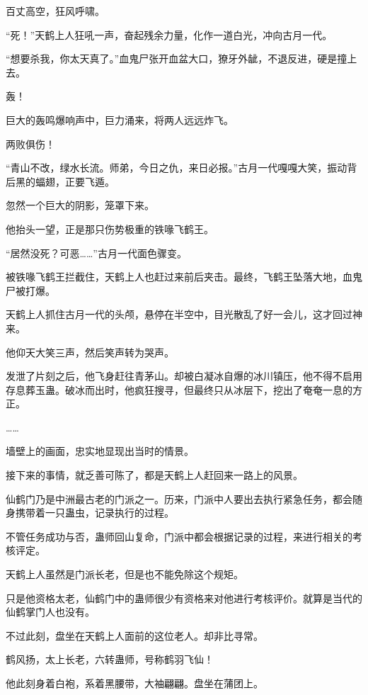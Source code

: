 
\begin{this_body}



百丈高空，狂风呼啸。

“死！”天鹤上人狂吼一声，奋起残余力量，化作一道白光，冲向古月一代。

“想要杀我，你太天真了。”血鬼尸张开血盆大口，獠牙外龇，不退反进，硬是撞上去。

轰！

巨大的轰鸣爆响声中，巨力涌来，将两人远远炸飞。

两败俱伤！

“青山不改，绿水长流。师弟，今日之仇，来日必报。”古月一代嘎嘎大笑，振动背后黑的蝠翅，正要飞遁。

忽然一个巨大的阴影，笼罩下来。

他抬头一望，正是那只伤势极重的铁喙飞鹤王。

“居然没死？可恶……”古月一代面色骤变。

被铁喙飞鹤王拦截住，天鹤上人也赶过来前后夹击。最终，飞鹤王坠落大地，血鬼尸被打爆。

天鹤上人抓住古月一代的头颅，悬停在半空中，目光散乱了好一会儿，这才回过神来。

他仰天大笑三声，然后笑声转为哭声。

发泄了片刻之后，他飞身赶往青茅山。却被白凝冰自爆的冰川镇压，他不得不启用存息葬玉蛊。破冰而出时，他疯狂搜寻，但最终只从冰层下，挖出了奄奄一息的方正。

……

墙壁上的画面，忠实地显现出当时的情景。

接下来的事情，就乏善可陈了，都是天鹤上人赶回来一路上的风景。

仙鹤门乃是中洲最古老的门派之一。历来，门派中人要出去执行紧急任务，都会随身携带着一只蛊虫，记录执行的过程。

不管任务成功与否，蛊师回山复命，门派中都会根据记录的过程，来进行相关的考核评定。

天鹤上人虽然是门派长老，但是也不能免除这个规矩。

只是他资格太老，仙鹤门中的蛊师很少有资格来对他进行考核评价。就算是当代的仙鹤掌门人也没有。

不过此刻，盘坐在天鹤上人面前的这位老人。却非比寻常。

鹤风扬，太上长老，六转蛊师，号称鹤羽飞仙！

他此刻身着白袍，系着黑腰带，大袖翩翩。盘坐在蒲团上。


\end{this_body}
